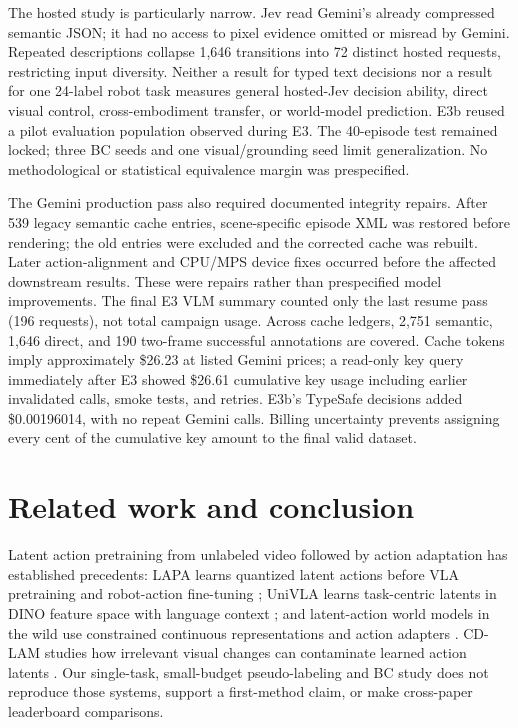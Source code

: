 \documentclass[11pt]{article}
\begin{document}
The hosted study is particularly narrow. Jev read Gemini's already
compressed semantic JSON; it had no access to pixel evidence omitted or
misread by Gemini. Repeated descriptions collapse 1,646 transitions into 72
distinct hosted requests, restricting input diversity. Neither a result for
typed text decisions nor a result for one 24-label robot task measures
general hosted-Jev decision ability, direct visual control, cross-embodiment
transfer, or world-model prediction. E3b reused a pilot evaluation
population observed during E3. The 40-episode test remained locked;
three BC seeds and one visual/grounding seed limit generalization. No
methodological or statistical equivalence margin was prespecified.

The Gemini production pass also required documented integrity repairs.
After 539 legacy semantic cache entries, scene-specific episode XML was
restored before rendering; the old entries were excluded and the corrected
cache was rebuilt. Later action-alignment and CPU/MPS device fixes occurred
before the affected downstream results. These were repairs rather than
prespecified model improvements. The final E3 VLM summary counted only the
last resume pass (196 requests), not total campaign usage. Across cache
ledgers, 2,751 semantic, 1,646 direct, and 190 two-frame successful
annotations are covered. Cache tokens imply approximately \$26.23 at
listed Gemini prices; a read-only key query immediately after E3 showed
\$26.61 cumulative key usage including earlier invalidated calls, smoke
tests, and retries. E3b's TypeSafe decisions added \$0.00196014, with no
repeat Gemini calls. Billing uncertainty prevents assigning every cent of
the cumulative key amount to the final valid dataset.

\section{Related work and conclusion}
Latent action pretraining from unlabeled video followed by action adaptation
has established precedents: LAPA learns quantized latent actions before
VLA pretraining and robot-action fine-tuning \citep{lapa}; UniVLA learns
task-centric latents in DINO feature space with language context
\citep{univla}; and latent-action world models in the wild use constrained
continuous representations and action adapters \citep{wild}. CD-LAM studies
how irrelevant visual changes can contaminate learned action latents
\citep{cdlam}. Our single-task, small-budget pseudo-labeling and BC study
does not reproduce those systems, support a first-method claim, or make
cross-paper leaderboard comparisons.
\end{document}
